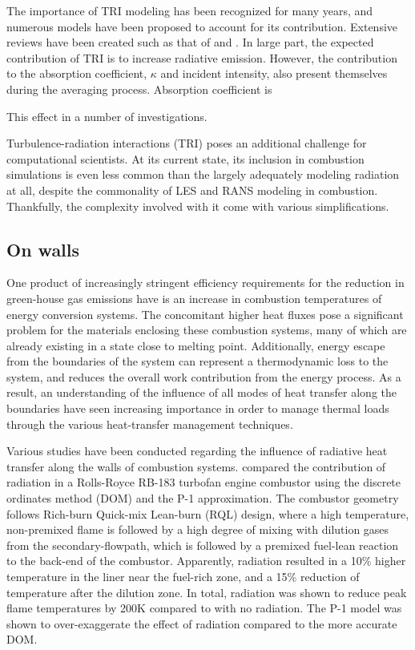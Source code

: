 The importance of TRI modeling has been recognized for many years, and numerous models have been proposed to account for its contribution. Extensive reviews have been created such as that of \citet{Modest2016RadiativeSystems} and \citet{Coelho2018RadiativeSystems}. 
In large part, the expected contribution of TRI is to increase radiative emission.
However, the contribution to the absorption coefficient, $\kappa{}$ and incident intensity, also present themselves during the averaging process.
Absorption coefficient is 



This effect in a number of investigations.



Turbulence-radiation interactions (TRI) poses an additional challenge for computational scientists. 
At its current state, its inclusion in combustion simulations is even less common than the largely adequately modeling radiation at all, despite the commonality of LES and RANS modeling in combustion.
Thankfully, the complexity involved with it come with various simplifications. 

\subsection{On walls}
One product of increasingly stringent efficiency requirements for the reduction in green-house gas emissions have is an increase in combustion temperatures of energy conversion systems. 
The concomitant higher heat fluxes pose a significant problem for the materials enclosing these combustion systems, many of which are already existing in a state close to melting point. 
Additionally, energy escape from the boundaries of the system can represent a thermodynamic loss to the system, and reduces the overall work contribution from the energy process.
As a result, an understanding of the influence of all modes of heat transfer along the boundaries have seen increasing importance in order to manage thermal loads through the various heat-transfer management techniques.

Various studies have been conducted regarding the influence of radiative heat transfer along the walls of combustion systems. \citet{Gamil2020AssessmentChamber} compared the contribution of radiation in a Rolls-Royce RB-183 turbofan engine combustor using the discrete ordinates method (DOM) and the P-1 approximation.
The combustor geometry follows Rich-burn Quick-mix Lean-burn (RQL) design, where a high temperature, non-premixed flame is followed by a high degree of mixing with dilution gases from the secondary-flowpath, which is followed by a premixed fuel-lean reaction to the back-end of the combustor.
Apparently, radiation resulted in a 10\% higher temperature in the liner near the fuel-rich zone, and a 15\% reduction of temperature after the dilution zone.
In total, radiation was shown to reduce peak flame temperatures by 200K compared to with no radiation.
The P-1 model was shown to over-exaggerate the effect of radiation compared to the more accurate DOM.

